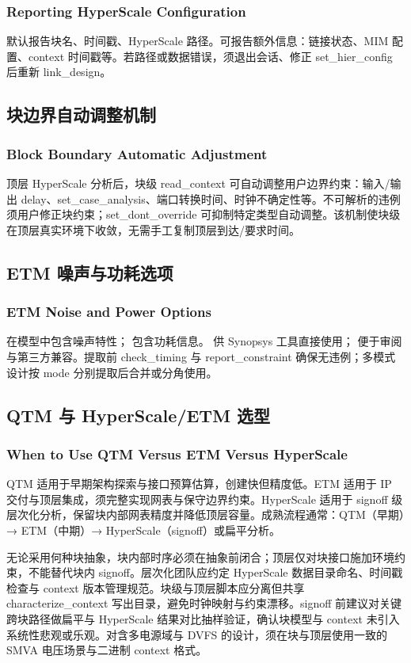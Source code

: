 \subsubsection*{Reporting HyperScale Configuration}

 默认报告块名、时间戳、HyperScale 路径。可报告额外信息：链接状态、MIM 配置、context 时间戳等。若路径或数据错误，须退出会话、修正 set_hier_config 后重新 link_design。

\subsection{块边界自动调整机制}
\subsubsection*{Block Boundary Automatic Adjustment}

顶层 HyperScale 分析后，块级 read_context 可自动调整用户边界约束：输入/输出 delay、set_case_analysis、端口转换时间、时钟不确定性等。不可解析的违例须用户修正块约束；set_dont_override 可抑制特定类型自动调整。该机制使块级在顶层真实环境下收敛，无需手工复制顶层到达/要求时间。

\subsection{ETM 噪声与功耗选项}
\subsubsection*{ETM Noise and Power Options}

 在模型中包含噪声特性； 包含功耗信息。 供 Synopsys 工具直接使用； 便于审阅与第三方兼容。提取前 check_timing 与 report_constraint 确保无违例；多模式设计按 mode 分别提取后合并或分角使用。

\subsection{QTM 与 HyperScale/ETM 选型}
\subsubsection*{When to Use QTM Versus ETM Versus HyperScale}

QTM 适用于早期架构探索与接口预算估算，创建快但精度低。ETM 适用于 IP 交付与顶层集成，须完整实现网表与保守边界约束。HyperScale 适用于 signoff 级层次化分析，保留块内部网表精度并降低顶层容量。成熟流程通常：QTM（早期）→ ETM（中期）→ HyperScale（signoff）或扁平分析。

无论采用何种块抽象，块内部时序必须在抽象前闭合；顶层仅对块接口施加环境约束，不能替代块内 signoff。层次化团队应约定 HyperScale 数据目录命名、时间戳检查与 context 版本管理规范。块级与顶层脚本应分离但共享 characterize_context 写出目录，避免时钟映射与约束漂移。signoff 前建议对关键跨块路径做扁平与 HyperScale 结果对比抽样验证，确认块模型与 context 未引入系统性悲观或乐观。对含多电源域与 DVFS 的设计，须在块与顶层使用一致的 SMVA 电压场景与二进制 context 格式。

